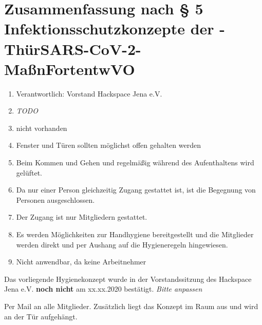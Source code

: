 \documentclass[a4paper,12pt,parskip=half]{scrartcl}
\begin{document}
\section*{Zusammenfassung nach § 5 Infektionsschutzkonzepte der -ThürSARS-CoV-2-
MaßnFortentwVO}
\begin{enumerate}
 \item Verantwortlich: Vorstand Hackspace Jena e.V.
 \item \emph{TODO}
 \item nicht vorhanden
 \item Fenster und Türen sollten möglichst offen gehalten werden
 \item Beim Kommen und Gehen und regelmäßig während des Aufenthaltens wird gelüftet.
 \item Da nur einer Person gleichzeitig Zugang gestattet ist, ist die Begegnung von Personen ausgeschlossen.
 \item Der Zugang ist nur Mitgliedern gestattet.
 \item Es werden Möglichkeiten zur Handhygiene bereitgestellt und die Mitglieder werden direkt und per Aushang auf die Hygieneregeln hingewiesen.
 \item Nicht anwendbar, da keine Arbeitnehmer
\end{enumerate}

Das vorliegende Hygienekonzept wurde in der Vorstandssitzung des Hackspace Jena e.V. \textbf{noch nicht} am xx.xx.2020 bestätigt. \emph{Bitte anpassen}

Per Mail an alle Mitglieder. Zusätzlich liegt das Konzept im Raum aus und wird an der Tür aufgehängt.
\end{document}

